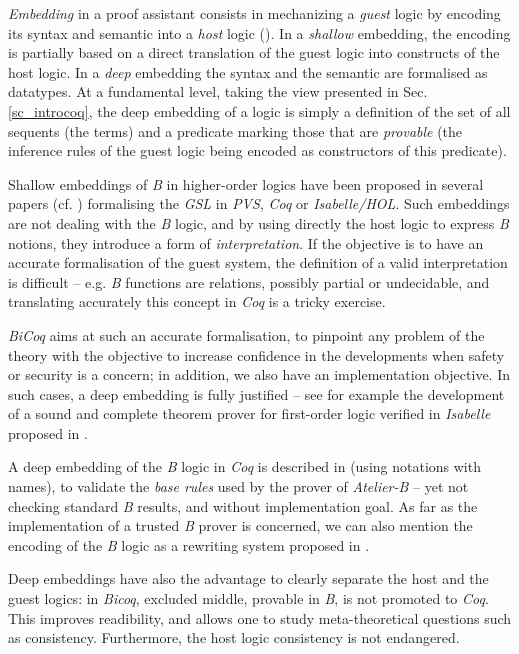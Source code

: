 \documentclass{llncs}
\begin{document}
\emph{Embedding} in a proof assistant consists in mechanizing a \emph{guest} logic by encoding 
its syntax and semantic into a \emph{host} logic (\cite{gor:2,bou:1,azu:1}). In a 
\emph{shallow} embedding, the encoding is partially based on a direct translation of the guest 
logic into constructs of the host logic. In a \emph{deep} embedding the syntax and the 
semantic are formalised as datatypes. At a fundamental level, taking the view presented in 
Sec. \ref{sc_introcoq}, the deep embedding of a logic is simply a definition of the set of all 
sequents (the terms) and a predicate marking those that are \emph{provable} (the inference 
rules of the guest logic being encoded as constructors of this predicate).

Shallow embeddings of \emph{B} in higher-order logics have been proposed in several papers
(cf. \cite{bod:1b,cha:1}) formalising the \emph{GSL} in \emph{PVS}, \emph{Coq} or
\emph{Isabelle/HOL}. Such embeddings are not dealing with the \emph{B} logic, and by using 
directly the host logic to express \emph{B} notions, they introduce a form of 
\emph{interpretation}. If the objective is to have an accurate formalisation of the guest 
system, the definition of a valid interpretation is difficult -- e.g. \emph{B} functions are 
relations, possibly partial or undecidable, and translating accurately this concept in 
\emph{Coq} is a tricky exercise.

\emph{BiCoq} aims at such an accurate formalisation, to pinpoint any problem of the theory 
with the objective to increase confidence in the developments when safety or security is a 
concern; in addition, we also have an implementation objective. In such cases, a deep 
embedding is fully justified -- see for example the development of a sound and complete 
theorem prover for first-order logic verified in \emph{Isabelle} proposed in \cite{rid:1}.

A deep embedding of the \emph{B} logic in \emph{Coq} is described in \cite{brk:1} (using
notations with names), to validate the \emph{base rules} used by the prover of 
\emph{Atelier-B} -- yet not checking standard \emph{B} results, and without implementation 
goal. As far as the implementation of a trusted \emph{B} prover is concerned, we can also 
mention the encoding of the \emph{B} logic as a rewriting system proposed in \cite{cir:1}.

Deep embeddings have also the advantage to clearly separate the host and the guest logics: in 
\emph{Bicoq}, excluded middle, provable in \emph{B}, is not promoted to \emph{Coq}. This 
improves readibility, and allows one to study meta-theoretical questions such as consistency. 
Furthermore, the host logic consistency is not endangered.
\end{document}

